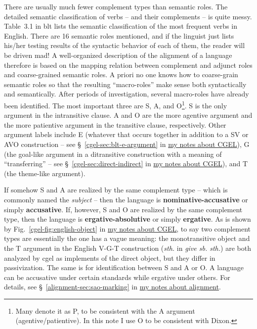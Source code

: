 \documentclass{article}
\newcommand*{\citesec}[1]{\S~{#1}}
\newcommand*{\citefig}[1]{Fig.~{#1}}
\newcommand*{\citetable}[1]{Table~{#1}}
\newcommand*{\concept}[1]{\textbf{#1}}
\newcommand*{\term}[1]{\emph{#1}}
\newcommand*{\corpus}[1]{\emph{#1}}
\newcommand{\cgel}{\href{../English/cambridge.pdf}{my notes about CGEL}}
\newcommand{\alignment}{\href{../alignment/alignment.pdf}{my notes about alignment}}
\begin{document}
There are usually much fewer complement types than semantic roles.
The detailed semantic classification of verbs -- and their complements -- is quite messy. 
\citetable{3.1} in \ac{blt} lists the semantic classification of the most frequent verbs in English.
There are 16 semantic roles mentioned, 
and if the linguist just lists his/her testing results of the syntactic behavior of each of them,
the reader will be driven mad!
A well-organized description of the alignment of a language therefore is based on 
the mapping relation between complement and adjunct roles and coarse-grained semantic roles.
A priori no one knows how to coarse-grain semantic roles 
so that the resulting ``macro-roles'' make sense both syntactically and semantically.
After periods of investigation, several macro-roles have already been identified.
The most important three are S, A, and O\footnote{
    Many denote it as P, to be consistent with the A argument (agentive/patientive). 
    In this note I use O to be consistent with Dixon.
}.
S is the only argument in the intransitive clause.
A and O are the more agentive argument and the more patientive argument in the transitive clause, 
respectively.
Other argument labels include E 
(whatever that occurs together in addition to a SV or AVO construction
-- see \citesec{\ref{cgel-sec:blt-e-argument}} in \cgel),
G (the goal-like argument in a ditransitive construction with a meaning of ``transferring''
-- see \citesec{\ref{cgel-sec:direct-indirect}} in \cgel),
and T (the theme-like argument).

If somehow S and A are realized by the same complement type 
-- which is commonly named the \term{subject} --
then the language is \concept{nominative-accusative} or simply \concept{accusative}.
If, however, S and O are realized by the same complement type,
then the language is \concept{ergative-absolutive} or simply \concept{ergative}.
As is shown by \citefig{\ref{cgel-fig:english-object}} in \cgel,
to say two complement types are essentially the one 
has a vague meaning:
the monotransitive object and the T argument in the English V-G-T construction 
(\term{sth.} in \corpus{give sb. sth.})
are both analyzed by \ac{cgel} as implements of the direct object,
but they differ in passivization.
The same is for identification between S and A or O.
A language can be accusative under certain standards while ergative under others.
For details, see \citesec{\ref{alignment-sec:sao-marking}} in \alignment.
\end{document}
